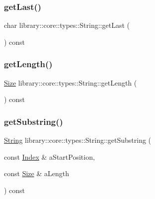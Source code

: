 \subsubsection{\texorpdfstring{getLast()}{getLast()}}
{\footnotesize\ttfamily char library\+::core\+::types\+::\+String\+::get\+Last (\begin{DoxyParamCaption}{ }\end{DoxyParamCaption}) const}

\mbox{\label{classlibrary_1_1core_1_1types_1_1_string_adc97f82ccc9a3d034bc3127e643199fb}} 
\subsubsection{\texorpdfstring{getLength()}{getLength()}}
{\footnotesize\ttfamily \mbox{\hyperlink{namespacelibrary_1_1core_1_1types_a701626ea1027888ebbb8cfd0ff7adab0}{Size}} library\+::core\+::types\+::\+String\+::get\+Length (\begin{DoxyParamCaption}{ }\end{DoxyParamCaption}) const}

\mbox{\label{classlibrary_1_1core_1_1types_1_1_string_aaf9377048b900766d05a1af9182cf251}} 
\subsubsection{\texorpdfstring{getSubstring()}{getSubstring()}}
{\footnotesize\ttfamily \mbox{\hyperlink{classlibrary_1_1core_1_1types_1_1_string}{String}} library\+::core\+::types\+::\+String\+::get\+Substring (\begin{DoxyParamCaption}\item[{const \mbox{\hyperlink{namespacelibrary_1_1core_1_1types_ad87eeb821d7067ec94e06ed1980d6350}{Index}} \&}]{a\+Start\+Position,  }\item[{const \mbox{\hyperlink{namespacelibrary_1_1core_1_1types_a701626ea1027888ebbb8cfd0ff7adab0}{Size}} \&}]{a\+Length }\end{DoxyParamCaption}) const}

